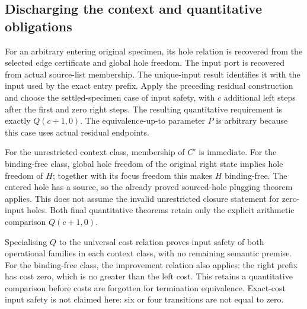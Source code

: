 
\subsection{Discharging the context and quantitative obligations}
For an arbitrary entering original specimen, its hole relation is recovered
from the selected edge certificate and global hole freedom. The input port
is recovered from actual source-list membership. The unique-input result
identifies it with the input used by the exact entry prefix.
Apply the preceding residual construction and choose the settled-specimen
case of input safety, with $c$ additional left steps after the first and
zero right steps. The resulting quantitative requirement is exactly
$Q(c+1,0)$. The equivalence-up-to parameter $P$ is arbitrary because this
case uses actual residual endpoints.


For the unrestricted context class, membership of $C'$ is immediate.
For the binding-free class, global hole freedom of the original right state
implies hole freedom of $H$; together with its focus freedom this makes $H$
binding-free. The entered hole has a source, so the already proved
sourced-hole plugging theorem applies. This does not assume the invalid
unrestricted closure statement for zero-input holes. Both final quantitative
theorems retain only the explicit arithmetic comparison $Q(c+1,0)$.


Specialising $Q$ to the universal cost relation proves input safety of both
operational families in each context class, with no remaining semantic
premise. For the binding-free class, the improvement relation also applies:
the right prefix has cost zero, which is no greater than the left cost.
This retains a quantitative comparison before costs are forgotten for
termination equivalence. Exact-cost input safety is not claimed here:
six or four transitions are not equal to zero.


